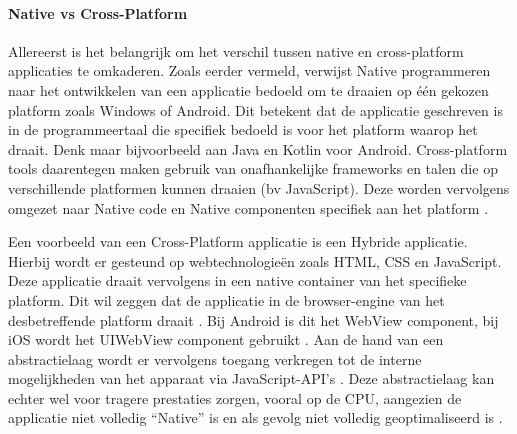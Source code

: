 \paragraph{Native vs Cross-Platform}
\newline
Allereerst is het belangrijk om het verschil tussen native en cross-platform applicaties te omkaderen. Zoals eerder vermeld, verwijst Native programmeren naar het ontwikkelen van een applicatie bedoeld om te draaien op één gekozen platform zoals Windows of Android. Dit betekent dat de applicatie geschreven is in de programmeertaal die specifiek bedoeld is voor het platform waarop het draait. Denk maar bijvoorbeeld aan Java en Kotlin voor Android. Cross-platform tools daarentegen maken gebruik van onafhankelijke frameworks en talen die op verschillende platformen kunnen draaien (bv JavaScript). Deze worden vervolgens omgezet naar Native code en Native componenten specifiek aan het platform \autocite{Bron2}.

Een voorbeeld van een Cross-Platform applicatie is een Hybride applicatie. Hierbij wordt er gesteund op webtechnologieën zoals HTML, CSS en JavaScript. Deze applicatie draait vervolgens in een native container van het specifieke platform. Dit wil zeggen dat de applicatie in de browser-engine van het desbetreffende platform draait \autocite{Bron6}. Bij Android is dit het WebView component, bij iOS wordt het UIWebView component gebruikt \autocite{Bron4}. Aan de hand van een abstractielaag wordt er vervolgens toegang verkregen tot de interne mogelijkheden van het apparaat via JavaScript-API's \autocite{Bron6}. Deze abstractielaag kan echter wel voor tragere prestaties zorgen, vooral op de CPU, aangezien de applicatie niet volledig ``Native'' is en als gevolg niet volledig geoptimaliseerd is \autocite{Bron1}.

